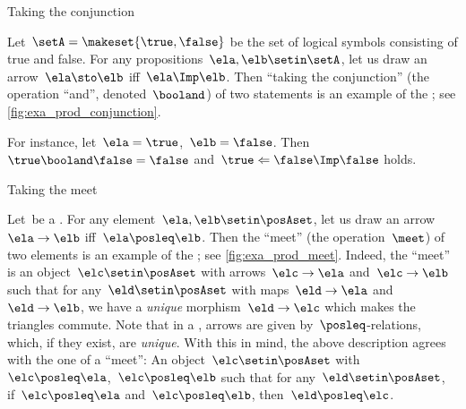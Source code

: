 \begin{marginfigure}
    \centering
    \caption{Taking the conjunction}
    \label{fig:exa_prod_conjunction}
\end{marginfigure}

\begin{example}
    \label{exa:conjunction-as-prod}
    Let~$\setA = \makeset{ \true, \false }$ be the set of logical symbols consisting of true and false.
    For any propositions~$\ela, \elb  \setin \setA$, let us draw an arrow~$\ela \sto \elb$ iff~$\ela \Imp \elb$.
    Then ``taking the conjunction'' (the operation ``and'', denoted~$\booland$) of two statements is an example of the ; see \cref{fig:exa_prod_conjunction}.

    For instance, let~$\ela= \true$,~$\elb = \false$.
    Then~$\true \booland \false = \false$ and~$\true \Leftarrow \false \Imp \false$ holds.
\end{example}

\begin{marginfigure}
    \centering
    \caption{Taking the meet}
    \label{fig:exa_prod_meet}
\end{marginfigure}

\begin{example}
    \label{exa:meet-as-prod}
    Let~\posA be a .
    For any element~$\ela, \elb \setin \posAset$, let us draw an arrow~$\ela \to \elb$ iff~$\ela \posleq \elb$.
    Then the ``meet'' (the operation~$\meet$) of two elements is an example of the ; see \cref{fig:exa_prod_meet}.
    Indeed, the ``meet'' is an object~$\elc \setin \posAset$ with arrows~$\elc\to \ela$ and~$\elc \to \elb$ such that for any~$\eld\setin \posAset$ with maps~$\eld\to \ela$ and~$\eld\to \elb$, we have a \emph{unique} morphism~$\eld\to \elc$ which makes the triangles commute.
    Note that in a , arrows are given by~$\posleq$-relations, which, if they exist, are \emph{unique}.
    With this in mind, the above description agrees with the one of a ``meet'':
    An object~$\elc\setin \posAset$ with $\elc\posleq \ela$,~$\elc\posleq \elb$ such that for any~$\eld\setin \posAset$, if~$\elc\posleq \ela$ and~$\elc\posleq \elb$, then~$\eld\posleq \elc$.
\end{example}

\begin{marginfigure}
    \centering
    \caption{}
    \label{fig:prod_generic}
\end{marginfigure}

